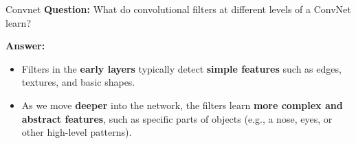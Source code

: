\documentclass[default, aspectratio=169]{beamer}
\begin{document}
	\begin{frame}{Convnet}
		\textbf{Question:}
		What do convolutional filters at different levels of a ConvNet learn?
		
		\bigskip
		
		\textbf{Answer:}
		\begin{itemize}
			\item Filters in the \textbf{early layers} typically detect \textbf{simple features} such as edges, textures, and basic shapes.
			\item As we move \textbf{deeper} into the network, the filters learn \textbf{more complex and abstract features}, such as specific parts of objects (e.g., a nose, eyes, or other high-level patterns).
		\end{itemize}
	\end{frame}
	
\end{document}
